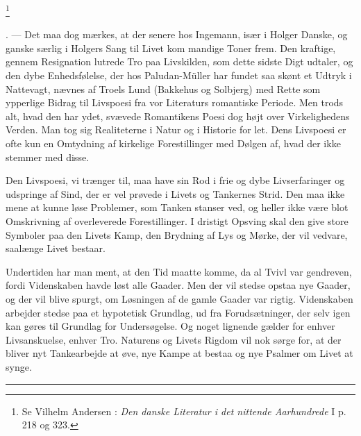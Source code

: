 \documentclass[12pt]{article}
\newcommand{\apage}[1]{\marginnote{\footnotesize\textit{[#1]}}}
\begin{document}
         \footnote{Se Vilhelm Andersen : \textit{Den danske Literatur i det
nittende Aarhundrede} I p. 218 og 323.}

      . --- Det maa dog mærkes, at der senere hos Ingemann, især i
\guillemotright{}Holger Danske\guillemotleft{}, og ganske særlig i
\guillemotright{}Holgers Sang til Livet\guillemotleft{} kom mandige Toner frem.
Den kraftige, gennem Resignation lutrede Tro paa Livskilden, som dette sidste
Digt udtaler, og den dybe Enhedsfølelse, der hos Paludan-Müller har fundet saa
skønt et Udtryk i \guillemotright{}Nattevagt\guillemotleft{}, nævnes af Troels
Lund (Bakkehus og Solbjerg) med Rette som ypperlige Bidrag til Livspoesi fra
vor Literaturs romantiske Periode. Men trods alt, hvad den har ydet, svævede
Romantikens Poesi dog højt over Virkelighedens Verden. Man tog sig Realiteterne
i Natur og i Historie for let. Dens Livspoesi er ofte kun en Omtydning af
kirkelige Forestillinger med Dølgen af, hvad der ikke stemmer med disse.

Den Livspoesi, vi trænger til, maa have sin Rod i frie og dybe Livserfaringer
og udspringe af Sind, der er vel prøvede i Livets og Tankernes Strid. Den maa
ikke mene at kunne løse Problemer, som Tanken stanser ved, og heller ikke være
blot Omskrivning af overleverede Forestillinger. I dristigt Opsving skal den
give store Symboler paa den Livets Kamp, den Brydning af Lys og Mørke, der vil
vedvare, saalænge Livet bestaar.

Undertiden har man ment, at den Tid maatte komme, da al Tvivl var gendreven,
fordi Videnskaben havde løst alle Gaader. Men der vil stedse opstaa nye Gaader,
og der
\setcounter{footnote}{0}%
\apage{122}vil blive spurgt, om Løsningen af de gamle Gaader var rigtig.
Videnskaben arbejder stedse paa et hypotetisk Grundlag, ud fra Forudsætninger,
der selv igen kan gøres til Grundlag for Undersøgelse. Og noget lignende gælder
for enhver Livsanskuelse, enhver Tro. Naturens og Livets Rigdom vil nok sørge
for, at der bliver nyt Tankearbejde at øve, nye Kampe at bestaa og nye Psalmer
om Livet at synge.

\begin{center}\rule{3em}{0.4pt}\end{center}
\setcounter{footnote}{0}%
\apage{123}%
\end{document}
